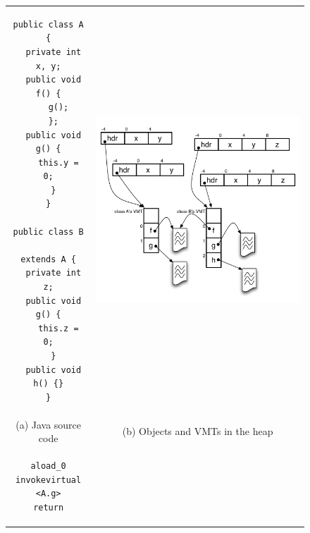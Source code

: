 \begin{figure}[p]
\lstset{frame=single}
\begin{tabular}[t]{@{}c@{ }c@{}}
\begin{minipage}{0.35\textwidth}
\begin{lstlisting}
public class A {
  private int x, y;
  public void f() {
    g();
  };
  public void g() {
    this.y = 0;
  }
}

public class B
          extends A {
  private int z;
  public void g() {
    this.z = 0;
  }
  public void h() {}
}
\end{lstlisting}
\end{minipage}
&
\begin{minipage}{0.64\textwidth}
\includegraphics[draft=false,scale=0.5]{100-images/field-method-access-explanation}
\end{minipage} \\
\begin{minipage}{0.28\textwidth}
(a) Java source code
\end{minipage} &
\begin{minipage}{0.44\textwidth}
(b) Objects and VMTs in the heap
\end{minipage} \\[2ex]
\begin{minipage}{0.35\textwidth}
\begin{lstlisting}
aload_0
invokevirtual <A.g>
return
\end{lstlisting}

\end{minipage}
\end{tabular}
\end{figure}
